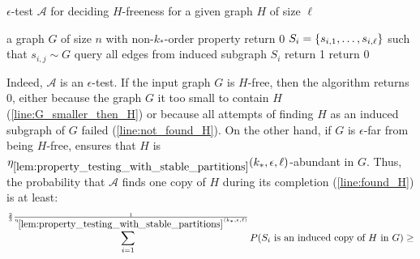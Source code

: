     \begin{algorithm}[H]
        \caption{$\epsilon$-test $\mathcal{A}$ for deciding $H$-freeness for a given graph $H$ of size $\ell$}
        \label{alg:h-freeness_tester}
        \begin{algorithmic}[1]
            \Require a graph $G$ of size $n$ with non-$k_*$-order property
                \State return 0 \label{line:G_smaller_then_H}
            \Else
                    \State $S_i = \{ s_{i,1}, \dots, s_{i,\ell} \}$ such that $s_{i,j} \sim G$
                    \State query all edges from induced subgraph $S_i$
                        \State return 1 \label{line:found_H}
                    \EndIf
                \EndWhile
                \State return 0 \label{line:not_found_H}
            \EndIf
        \end{algorithmic}
    \end{algorithm}

    Indeed, $\mathcal{A}$ is an $\epsilon$-test.
    If the input graph $G$ is $H$-free, then the algorithm returns $0$, either because the graph $G$ it too small to
    contain $H$ (\cref{line:G_smaller_then_H}) or because all attempts of finding $H$ as an induced subgraph of $G$
    failed (\cref{line:not_found_H}).
    On the other hand, if $G$ is $\epsilon$-far from being $H$-free, 
    ensures that $H$ is $\eta_{\ref{lem:property_testing_with_stable_partitions}}(k_*, \epsilon, \ell)$-abundant in $G$.
    Thus, the probability that $\mathcal{A}$ finds one copy of $H$ during its completion (\cref{line:found_H}) is at least:
    \[
        \sum_{i=1}^{\frac{2}{3}\frac{1}{\eta_{\ref{lem:property_testing_with_stable_partitions}}(k_*, \epsilon, \ell)}}
                P( S_i \text{ is an induced copy of } H \text{ in } G )
            \geq
    \]

    \jojo



